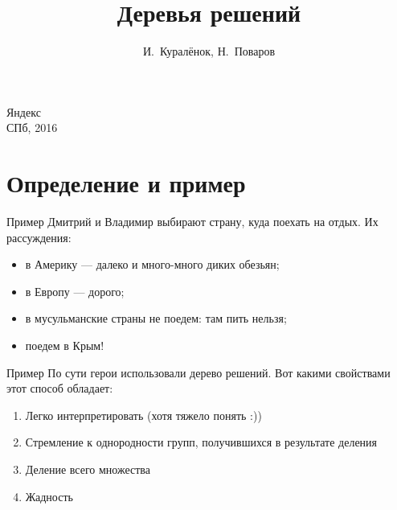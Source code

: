 \documentclass[14pt, fleqn, xcolor={dvipsnames, table}]{beamer}
\title{Деревья решений\\\small{}}
\author[]{\small{%
И.~Куралёнок,
Н.~Поваров}}
\date{}
\begin{document}
\begin{frame}
\maketitle
\small
\begin{center}
\vspace{-60pt}
\normalsize {\color{red}Я}ндекс \\
\vspace{80pt}
\footnotesize СПб, 2016
\end{center}
\end{frame}

\section{Определение и пример}
\begin{frame}{Пример}
Дмитрий и Владимир выбирают страну, куда поехать на отдых. Их рассуждения:
\begin{itemize}
  \item в Америку --- далеко и много-много диких обезьян;
  \item в Европу --- дорого;
  \item в мусульманские страны не поедем: там пить нельзя;
  \item поедем в Крым!
\end{itemize}
\end{frame}

\begin{frame}{Пример}
По сути герои использовали дерево решений. Вот какими свойствами этот способ обладает:
\begin{enumerate}
  \item Легко интерпретировать (хотя тяжело понять :))
  \item Стремление к однородности групп, получившихся в результате деления
  \item Деление всего множества
  \item Жадность
\end{enumerate}
\end{frame}
\end{document}
